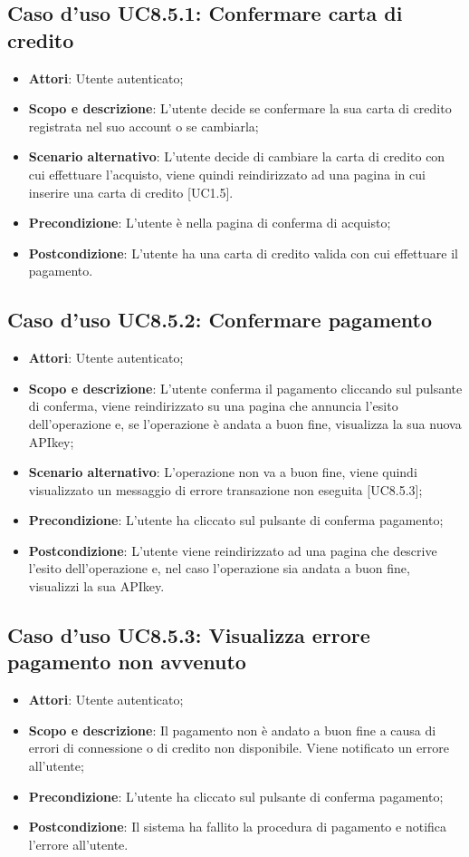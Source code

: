 \documentclass[12pt,a4paper,titlepage]{article}
\begin{document}
	\subsection{Caso d'uso UC8.5.1: Confermare carta di credito}
	\label{UC8.5.1}
	\begin{itemize}
		\item \textbf{Attori}: Utente autenticato;
		\item \textbf{Scopo e descrizione}: L'utente decide se confermare la sua carta di credito registrata nel suo account o se cambiarla;
		\item \textbf{Scenario alternativo}: L'utente decide di cambiare la carta di credito con cui effettuare l'acquisto, viene quindi reindirizzato ad una pagina in cui inserire una carta di credito [UC1.5].
		\item \textbf{Precondizione}: L'utente è nella pagina di conferma di acquisto;
		\item \textbf{Postcondizione}: L'utente ha una carta di credito valida con cui effettuare il pagamento.
	\end{itemize}
	\subsection{Caso d'uso UC8.5.2: Confermare pagamento}
	\label{UC8.5.2}
	\begin{itemize}
		\item \textbf{Attori}: Utente autenticato;
		\item \textbf{Scopo e descrizione}: L'utente conferma il pagamento cliccando sul pulsante di conferma, viene reindirizzato su una pagina che annuncia l'esito dell'operazione e, se l'operazione è andata a buon fine, visualizza la sua nuova APIkey;
		\item \textbf{Scenario alternativo}: L'operazione non va a buon fine, viene quindi visualizzato un messaggio di errore transazione non eseguita [UC8.5.3];
		\item \textbf{Precondizione}: L'utente ha cliccato sul pulsante di conferma pagamento;
		\item \textbf{Postcondizione}: L'utente viene reindirizzato ad una pagina che descrive l'esito dell'operazione e, nel caso l'operazione sia andata a buon fine, visualizzi la sua APIkey.
	\end{itemize}
	\subsection{Caso d'uso UC8.5.3: Visualizza errore pagamento non avvenuto}
	\label{UC8.5.3}
	\begin{itemize}
		\item \textbf{Attori}: Utente autenticato;
		\item \textbf{Scopo e descrizione}: Il pagamento non è andato a buon fine a causa di errori di connessione o di credito non disponibile. Viene notificato un errore all'utente;
		\item \textbf{Precondizione}: L'utente ha cliccato sul pulsante di conferma pagamento;
		\item \textbf{Postcondizione}: Il sistema ha fallito la procedura di pagamento e notifica l'errore all'utente.
	\end{itemize}
\end{document}
